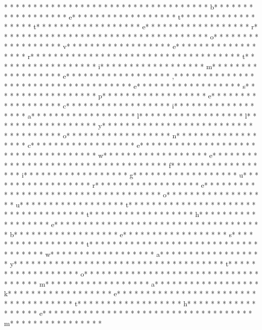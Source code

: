 * *  * * *  * * *  *  * * *  *  * * *  *  * * *  * * *  * * *  *  * * *  *  * * *  * b* * *  * * *  * * *  *  * * *  *  * * *  * e* * *  * * *  * * *  *  * * *  *  * * *  * t* * *  * * *  * * *  *  * * *  *  * * *  * t* * *  * * *  * * *  *  * * *  *  * * *  * e* * *  * * *  * * *  *  * * *  *  * * *  * r* * *  * * *  * * *  *  * * *  *  * * *  *  * * *  * * *  * * *  *  * * *  *  * * *  * o* * *  * * *  * * *  *  * * *  *  * * *  * v* * *  * * *  * * *  *  * * *  *  * * *  * e* * *  * * *  * * *  *  * * *  *  * * *  * r* * *  * * *  * * *  *  * * *  *  * * *  *  * * *  * * *  * * *  *  * * *  *  * * *  * t* * *  * * *  * * *  *  * * *  *  * * *  * i* * *  * * *  * * *  *  * * *  *  * * *  * m* * *  * * *  * * *  *  * * *  *  * * *  * e* * *  * * *  * * *  *  * * *  *  * * *  * ,* * *  * * *  * * *  *  * * *  *  * * *  *  * * *  * * *  * * *  *  * * *  *  * * *  * e* * *  * * *  * * *  *  * * *  *  * * *  * s* * *  * * *  * * *  *  * * *  *  * * *  * p* * *  * * *  * * *  *  * * *  *  * * *  * e* * *  * * *  * * *  *  * * *  *  * * *  * c* * *  * * *  * * *  *  * * *  *  * * *  * i* * *  * * *  * * *  *  * * *  *  * * *  * a* * *  * * *  * * *  *  * * *  *  * * *  * l* * *  * * *  * * *  *  * * *  *  * * *  * l* * *  * * *  * * *  *  * * *  *  * * *  * y* * *  * * *  * * *  *  * * *  *  * * *  *  * * *  * * *  * * *  *  * * *  *  * * *  * o* * *  * * *  * * *  *  * * *  *  * * *  * n* * *  * * *  * * *  *  * * *  *  * * *  * c* * *  * * *  * * *  *  * * *  *  * * *  * e* * *  * * *  * * *  *  * * *  *  * * *  *  * * *  * * *  * * *  *  * * *  *  * * *  * w* * *  * * *  * * *  *  * * *  *  * * *  * e* * *  * * *  * * *  *  * * *  *  * * *  *  * * *  * * *  * * *  *  * * *  *  * * *  * f* * *  * * *  * * *  *  * * *  *  * * *  * i* * *  * * *  * * *  *  * * *  *  * * *  * g* * *  * * *  * * *  *  * * *  *  * * *  * u* * *  * * *  * * *  *  * * *  *  * * *  * r* * *  * * *  * * *  *  * * *  *  * * *  * e* * *  * * *  * * *  *  * * *  *  * * *  *  * * *  * * *  * * *  *  * * *  *  * * *  * o* * *  * * *  * * *  *  * * *  *  * * *  * u* * *  * * *  * * *  *  * * *  *  * * *  * t* * *  * * *  * * *  *  * * *  *  * * *  *  * * *  * * *  * * *  *  * * *  *  * * *  * t* * *  * * *  * * *  *  * * *  *  * * *  * h* * *  * * *  * * *  *  * * *  *  * * *  * e* * *  * * *  * * *  *  * * *  *  * * *  *  * * *  * * *  * * *  *  * * *  *  * * *  * b* * *  * * *  * * *  *  * * *  *  * * *  * e* * *  * * *  * * *  *  * * *  *  * * *  * s* * *  * * *  * * *  *  * * *  *  * * *  * t* * *  * * *  * * *  *  * * *  *  * * *  *  * * *  * * *  * * *  *  * * *  *  * * *  * w* * *  * * *  * * *  *  * * *  *  * * *  * a* * *  * * *  * * *  *  * * *  *  * * *  * y* * *  * * *  * * *  *  * * *  *  * * *  *  * * *  * * *  * * *  *  * * *  *  * * *  * t* * *  * * *  * * *  *  * * *  *  * * *  * o* * *  * * *  * * *  *  * * *  *  * * *  *  * * *  * * *  * * *  *  * * *  *  * * *  * m* * *  * * *  * * *  *  * * *  *  * * *  * a* * *  * * *  * * *  *  * * *  *  * * *  * k* * *  * * *  * * *  *  * * *  *  * * *  * e* * *  * * *  * * *  *  * * *  *  * * *  *  * * *  * * *  * * *  *  * * *  *  * * *  * t* * *  * * *  * * *  *  * * *  *  * * *  * h* * *  * * *  * * *  *  * * *  *  * * *  * e* * *  * * *  * * *  *  * * *  *  * * *  *  * * *  * * *  * * *  *  * * *  *  * * *  * m* * *  * * *  * * *  *  * * *  *  * * 